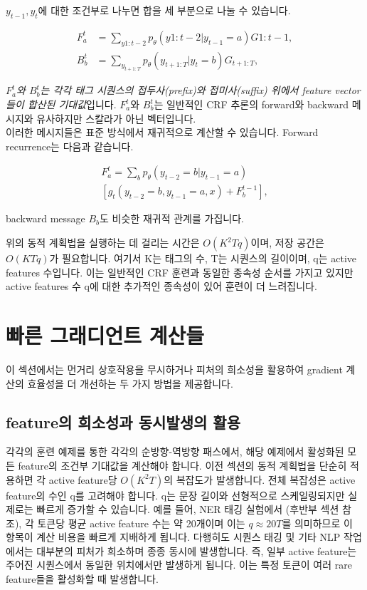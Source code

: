 \documentclass{article}
\begin{document}
$y_{t-1}, y_t$에 대한 조건부로 나누면 합을 세 부분으로 나눌 수 있습니다.

\begin{align}
    F_a^t &= \sum_{y1:t-2} p_\theta(y1:t-2 | y_{t-1} = a) G1:t-1, \\
    B_b^t &= \sum_{y_{t+1:T}} p_\theta(y_{t+1:T} | y_t = b) G_{t+1:T},
\end{align}

\textit{$F_a^t$와 $B_b^t$는 각각 태그 시퀀스의 접두사(prefix)와 접미사(suffix) 위에서 feature vector들이 합산된 기대값}입니다. $F_a^t$와 $B_b^t$는 일반적인 CRF 추론의 forward와 backward 메시지와 유사하지만 스칼라가 아닌 벡터입니다.\\

이러한 메시지들은 표준 방식에서 재귀적으로 계산할 수 있습니다. Forward recurrence는 다음과 같습니다.

\begin{align*}
    F_a^t = \sum_b p_\theta(y_{t-2} = b | y_{t-1} = a)\\
    \left[ g_t(y_{t-2} = b, y_{t-1} = a, x) + F_b^{t-1} \right],
\end{align*}

backward message $B_b$도 비슷한 재귀적 관계를 가집니다.

위의 동적 계획법을 실행하는 데 걸리는 시간은 $O(K^2Tq)$이며, 저장 공간은 $O(KTq)$가 필요합니다. 여기서 K는 태그의 수, T는 시퀀스의 길이이며, q는 active features 수입니다. 이는 일반적인 CRF 훈련과 동일한 종속성 순서를 가지고 있지만 active features 수 q에 대한 추가적인 종속성이 있어 훈련이 더 느려집니다.

\section{빠른 그래디언트 계산들}
이 섹션에서는 먼거리 상호작용을 무시하거나 피처의 희소성을 활용하여 gradient 계산의 효율성을 더 개선하는 두 가지 방법을 제공합니다.

\subsection{feature의 희소성과 동시발생의 활용}
각각의 훈련 예제를 통한 각각의 순방향-역방향 패스에서, 해당 예제에서 활성화된 모든 feature의 조건부 기대값을 계산해야 합니다. 이전 섹션의 동적 계획법을 단순히 적용하면 각 active feature당 $O(K^2T)$의 복잡도가 발생합니다. 전체 복잡성은 active feature의 수인 q를 고려해야 합니다. q는 문장 길이와 선형적으로 스케일링되지만 실제로는 빠르게 증가할 수 있습니다. 예를 들어, NER 태깅 실험에서 (후반부 섹션 참조), 각 토큰당 평균 active feature 수는 약 20개이며 이는 $q \approx 20T$를 의미하므로 이 항목이 계산 비용을 빠르게 지배하게 됩니다. 다행히도 시퀀스 태깅 및 기타 NLP 작업에서는 대부분의 피처가 희소하며 종종 동시에 발생합니다. 즉, 일부 active feature는 주어진 시퀀스에서 동일한 위치에서만 발생하게 됩니다. 이는 특정 토큰이 여러 rare feature들을 활성화할 때 발생합니다.\\
\end{document}
